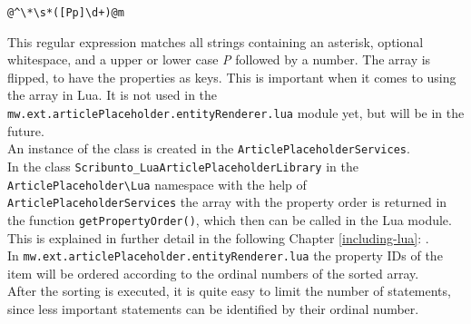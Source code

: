\begin{lstlisting}[frame=single] 
@^\*\s*([Pp]\d+)@m
\end{lstlisting}
This regular expression matches all strings containing an asterisk, optional whitespace, and a upper or lower case \textit{P} followed by a number.
The array is flipped, to have the properties as keys. This is important when it comes to using the array in Lua. It is not used in the \texttt{\justify mw.ext.articlePlaceholder.entityRenderer.lua} module yet, but will be in the future. \\
An instance of the class is created in the \texttt{\justify ArticlePlaceholderServices}. \\
In the class \texttt{\justify Scribunto\_LuaArticlePlaceholderLibrary} in the \texttt{\justify ArticlePlaceholder\textbackslash{}Lua} namespace with the help of \texttt{\justify ArticlePlaceholderServices} the array with the property order is returned in the function \texttt{\justify getPropertyOrder()}, which then can be called in the Lua module. This is explained in further detail in the following Chapter \ref{including-lua}: . \\
In \texttt{\justify mw.ext.articlePlaceholder.entityRenderer.lua} the property IDs of the item will be ordered according to the ordinal numbers of the sorted array. \\ 
After the sorting is executed, it is quite easy to limit the number of statements, since less important statements can be identified by their ordinal number.